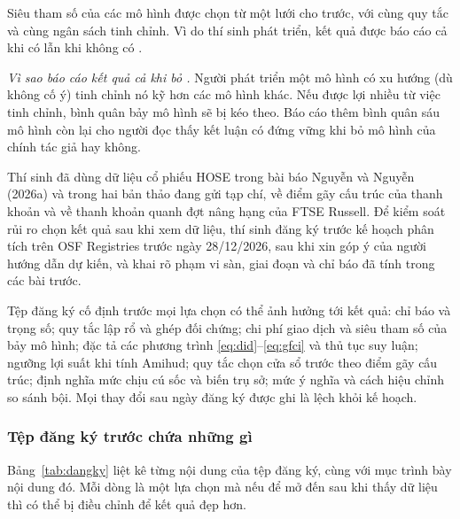 Siêu tham số của các mô hình được chọn từ một lưới cho trước, với cùng quy tắc và cùng ngân sách tinh chỉnh. Vì  do thí sinh phát triển, kết quả được báo cáo cả khi có lẫn khi không có .

\begin{vidao}
\emph{Vì sao báo cáo kết quả cả khi bỏ .} Người phát triển một mô hình có xu hướng (dù không cố ý) tinh chỉnh nó kỹ hơn các mô hình khác. Nếu  được lợi nhiều từ việc tinh chỉnh, bình quân bảy mô hình sẽ bị kéo theo. Báo cáo thêm bình quân sáu mô hình còn lại cho người đọc thấy kết luận có đứng vững khi bỏ mô hình của chính tác giả hay không.
\end{vidao}

Thí sinh đã dùng dữ liệu cổ phiếu HOSE trong bài báo Nguyễn và Nguyễn (2026a) và trong hai bản thảo đang gửi tạp chí, về điểm gãy cấu trúc của thanh khoản và về thanh khoản quanh đợt nâng hạng của FTSE Russell. Để kiểm soát rủi ro chọn kết quả sau khi xem dữ liệu, thí sinh đăng ký trước kế hoạch phân tích trên OSF Registries trước ngày 28/12/2026, sau khi xin góp ý của người hướng dẫn dự kiến, và khai rõ phạm vi sàn, giai đoạn và chỉ báo đã tính trong các bài trước.

Tệp đăng ký cố định trước mọi lựa chọn có thể ảnh hưởng tới kết quả: chỉ báo và trọng số; quy tắc lập rổ và ghép đối chứng; chi phí giao dịch và siêu tham số của bảy mô hình; đặc tả các phương trình \eqref{eq:did}--\eqref{eq:gfci} và thủ tục suy luận; ngưỡng lợi suất khi tính Amihud; quy tắc chọn cửa sổ trước theo điểm gãy cấu trúc; định nghĩa mức chịu cú sốc và biến trụ sở; mức ý nghĩa và cách hiệu chỉnh so sánh bội. Mọi thay đổi sau ngày đăng ký được ghi là lệch khỏi kế hoạch.

\subsubsection*{Tệp đăng ký trước chứa những gì}

Bảng~\ref{tab:dangky} liệt kê từng nội dung của tệp đăng ký, cùng với mục trình bày nội dung đó. Mỗi dòng là một lựa chọn mà nếu để mở đến sau khi thấy dữ liệu thì có thể bị điều chỉnh để kết quả đẹp hơn.

